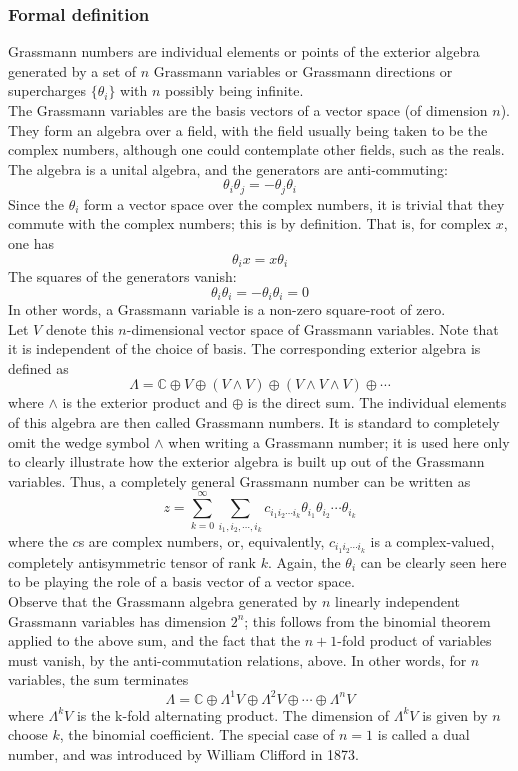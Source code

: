 \subsubsection{Formal definition}
Grassmann numbers are individual elements or points of the exterior algebra generated by a set of $n$ Grassmann variables or Grassmann directions or supercharges $\{\theta _{i}\}$ with $n$ possibly being infinite.
\\
The Grassmann variables are the basis vectors of a vector space (of dimension $n$). 
They form an algebra over a field, with the field usually being taken to be the complex numbers, although one could contemplate other fields, such as the reals. The algebra is a unital algebra, and the generators are anti-commuting:
\[\theta _{i}\theta _{j}=-\theta _{j}\theta _{i}\]
Since the $\theta _{i}$ form a vector space over the complex numbers, it is trivial that they commute with the complex numbers; this is by definition. That is, for complex $x$, one has
\[\theta _{i}x=x\theta _{i}\]
The squares of the generators vanish:
\[\theta_i \theta_i = -\theta_i \theta_i = 0\]
In other words, a Grassmann variable is a non-zero square-root of zero.
\\
Let $V$ denote this $n$-dimensional vector space of Grassmann variables. 
Note that it is independent of the choice of basis. The corresponding exterior algebra is defined as
\[\Lambda =\mathbb {C} \oplus V\oplus \left(V\wedge V\right)\oplus \left(V\wedge V\wedge V\right)\oplus \cdots\]
where $\wedge$ is the exterior product and $\oplus$ is the direct sum. The individual elements of this algebra are then called Grassmann numbers. It is standard to completely omit the wedge symbol $\wedge$ when writing a Grassmann number; it is used here only to clearly illustrate how the exterior algebra is built up out of the Grassmann variables. Thus, a completely general Grassmann number can be written as
\[z=\sum _{k=0}^{\infty }\sum _{i_{1},i_{2},\cdots ,i_{k}}c_{i_{1}i_{2}\cdots i_{k}}\theta _{i_{1}}\theta _{i_{2}}\cdots \theta _{i_{k}}\]
where the $c$s are complex numbers, or, equivalently, $c_{i_{1}i_{2}\cdots i_{k}}$ is a complex-valued, completely antisymmetric tensor of rank $k$. Again, the $\theta _{i}$ can be clearly seen here to be playing the role of a basis vector of a vector space.
\\
Observe that the Grassmann algebra generated by $n$ linearly independent Grassmann variables has dimension $2^n$; this follows from the binomial theorem applied to the above sum, and the fact that the $n+1$-fold product of variables must vanish, by the anti-commutation relations, above. In other words, for $n$ variables, the sum terminates
\[\Lambda =\mathbb {C} \oplus \Lambda ^{1}V\oplus \Lambda ^{2}V\oplus \cdots \oplus \Lambda ^{n}V\]
where $\Lambda ^{k}V$ is the k-fold alternating product. The dimension of  $\Lambda ^{k}V$ is given by $n$ choose $k$, the binomial coefficient. The special case of $n=1$ is called a dual number, and was introduced by William Clifford in 1873.

